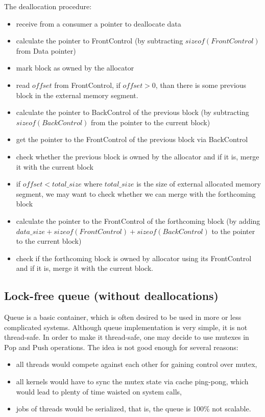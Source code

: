 \documentclass{article}
\begin{document}
The deallocation procedure:
\begin{itemize}
\item receive from a consumer a pointer to deallocate data
\item calculate the pointer to FrontControl (by subtracting $sizeof(FrontControl)$ from Data pointer)
\item mark block as owned by the allocator
\item read $offset$ from FrontControl, if $offset > 0$, than there is some previous block in the external memory segment.
\item calculate the pointer to BackControl of the previous block (by subtracting $sizeof(BackControl)$ from the pointer to the current block)
\item get the pointer to the FrontControl of the previous block via BackControl
\item check whether the previous block is owned by the allocator and if it is, merge it with the current block
\item if $offset < total\_size$ where $total\_size$ is the size of external allocated memory segment, we may want to check whether we can merge with the forthcoming block
\item calculate the pointer to the FrontControl of the forthcoming block (by adding $data\_size + sizeof(FrontControl) + sizeof(BackControl)$ to the pointer to the current block)
\item check if the forthcoming block is owned by allocator using its FrontControl and if it is, merge it with the current block.
\end{itemize}
\newpage

\subsection{Lock-free queue (without deallocations)}
\label{subsec:lock_free_queue}

Queue is a basic container, which is often desired to be used in more or less complicated systems. Although queue implementation is very simple, it is not thread-safe. In order to make it thread-safe, one may decide to use mutexes in Pop and Push operations. The idea is not good enough for several reasons:
\begin{itemize}
	\item all threads would compete against each other for gaining control over mutex,
	\item all kernels would have to sync the mutex state via cache ping-pong, which would lead to plenty of time waisted on system calls,
	\item jobs of threads would be serialized, that is, the queue is 100\% not scalable.
\end{itemize}
\end{document}
